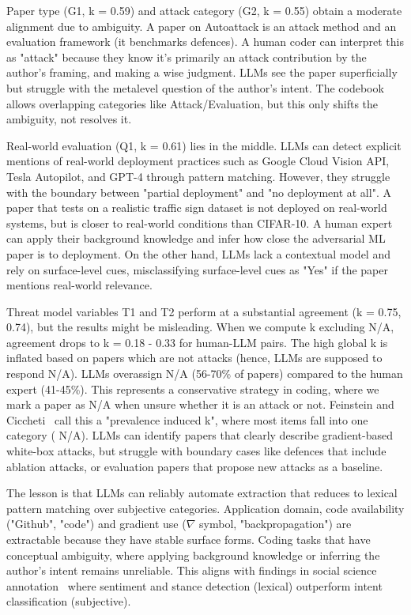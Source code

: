 \documentclass[conference,compsoc]{IEEEtran}
\begin{document}
Paper type (G1, k = 0.59) and attack category (G2, k = 0.55) obtain a moderate alignment due to ambiguity. A paper on Autoattack is an attack method and an evaluation framework (it benchmarks defences). A human coder can interpret this as "attack" because they know it's primarily an attack contribution by the author's framing, and making a wise judgment. LLMs see the paper superficially but struggle with the metalevel question of the author's intent. The codebook allows overlapping categories like Attack/Evaluation, but this only shifts the ambiguity, not resolves it.

Real-world evaluation (Q1, k = 0.61) lies in the middle. LLMs can detect explicit mentions of real-world deployment practices such as Google Cloud Vision API, Tesla Autopilot, and GPT-4 through pattern matching. However, they struggle with the boundary between "partial deployment" and "no deployment at all". A paper that tests on a realistic traffic sign dataset is not deployed on real-world systems, but is closer to real-world conditions than CIFAR-10. A human expert can apply their background knowledge and infer how close the adversarial ML paper is to deployment. On the other hand, LLMs lack a contextual model and rely on surface-level cues, misclassifying surface-level cues as "Yes" if the paper mentions real-world relevance.

Threat model variables T1 and T2 perform at a substantial agreement (k = 0.75, 0.74), but the results might be misleading. When we compute k excluding N/A, agreement drops to k = 0.18 - 0.33 for human-LLM pairs. The high global k is inflated based on papers which are not attacks (hence, LLMs are supposed to respond N/A). LLMs overassign N/A (56-70\% of papers) compared to the human expert (41-45\%). This represents a conservative strategy in coding, where we mark a paper as N/A when unsure whether it is an attack or not. Feinstein and Ciccheti~\cite{feinstein1990high} call this a "prevalence induced k", where most items fall into one category ( N/A). LLMs can identify papers that clearly describe gradient-based white-box attacks, but struggle with boundary cases like defences that include ablation attacks, or evaluation papers that propose new attacks as a baseline.

The lesson is that LLMs can reliably automate extraction that reduces to lexical pattern matching over subjective categories. Application domain, code availability ("Github", "code") and gradient use ($\nabla$ symbol, "backpropagation") are extractable because they have stable surface forms. Coding tasks that have conceptual ambiguity, where applying background knowledge or inferring the author's intent remains unreliable. This aligns with findings in social science annotation~\cite{ziems2024can} where sentiment and stance detection (lexical) outperform intent classification (subjective).
\end{document}
